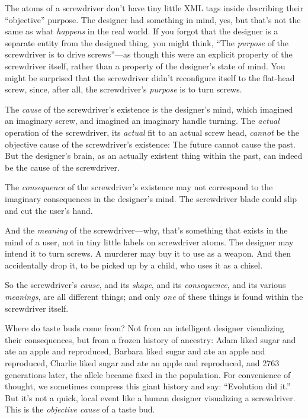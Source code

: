{
 The atoms of a screwdriver don't have tiny little
XML tags inside describing their
``objective'' purpose. The designer
had something in mind, yes, but that's not the same as
what \textit{happens} in the real world. If you forgot that the
designer is a separate entity from the designed thing, you might think,
``The \textit{purpose} of the screwdriver is to drive
screws''---as though this were an explicit property
of the screwdriver itself, rather than a property of the
designer's state of mind. You might be surprised that
the screwdriver didn't reconfigure itself to the
flat-head screw, since, after all, the screwdriver's
\textit{purpose} is to turn screws.}

{
 The \textit{cause} of the screwdriver's existence
is the designer's mind, which imagined an imaginary
screw, and imagined an imaginary handle turning. The \textit{actual}
operation of the screwdriver, its \textit{actual} fit to an actual
screw head, \textit{cannot} be the objective cause of the
screwdriver's existence: The future cannot cause the
past. But the designer's brain, as an actually existent
thing within the past, can indeed be the cause of the screwdriver.}

{
 The \textit{consequence} of the screwdriver's
existence may not correspond to the imaginary consequences in the
designer's mind. The screwdriver blade could slip and
cut the user's hand.}

{
 And the \textit{meaning} of the screwdriver---why,
that's something that exists in the mind of a user, not
in tiny little labels on screwdriver atoms. The designer may intend it
to turn screws. A murderer may buy it to use as a weapon. And then
accidentally drop it, to be picked up by a child, who uses it as a
chisel.}

{
 So the screwdriver's \textit{cause}, and its
\textit{shape}, and its \textit{consequence}, and its various
\textit{meanings}, are all different things; and only \textit{one} of
these things is found within the screwdriver itself.}

{
 Where do taste buds come from? Not from an intelligent designer
visualizing their consequences, but from a frozen history of ancestry:
Adam liked sugar and ate an apple and reproduced, Barbara liked sugar
and ate an apple and reproduced, Charlie liked sugar and ate an apple
and reproduced, and 2763 generations later, the allele became fixed in
the population. For convenience of thought, we sometimes compress this
giant history and say: ``Evolution did
it.'' But it's not a quick, local
event like a human designer visualizing a screwdriver. This is the
\textit{objective cause} of a taste bud.}

